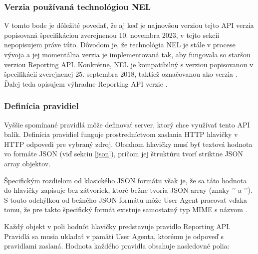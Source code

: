 \subsubsection{Verzia používaná technológiou NEL}

V tomto bode je dôležité povedať, že aj keď je najnovšou verziou tejto API verzia popisovaná špecifikáciou zverejnenou 10. novembra 2023, v tejto sekcii nepopisujem práve túto.
Dôvodom je, že technológia NEL je stále v procese vývoja a jej momentálna verzia je implementovaná tak, aby fungovala so staršou verziou Reporting API.
Konkrétne, NEL je kompatibilný s verziou popisovanou v špecifikácií zverejnenej 
25. septembra 2018, taktiež označovanou ako verzia \textbf{}.
Ďalej teda opisujem výhradne Reporting API verzie .

\subsubsection{Definícia pravidiel}

Vyššie spomínané pravidlá môže definovať server, ktorý chce využívať tento API balík. 
Definícia pravidiel funguje prostredníctvom zaslania HTTP hlavičky  v HTTP odpovedi pre vybraný zdroj.
Obsahom hlavičky  musí byť textová hodnota vo formáte JSON (viď sekciu \ref{json}), pričom jej štruktúru tvorí striktne JSON array objektov.

Špecifickým rozdielom od klasického JSON formátu však je, že sa táto hodnota do hlavičky
zapisuje bez zátvoriek, ktoré bežne tvoria JSON array (znaky '\code{[}' a '\code{]}').
S touto odchýlkou od bežného JSON formátu môže User Agent pracovať vďaka tomu, že pre takto špecifický formát existuje samostatný typ MIME s názvom . 

\pagebreak

Každý objekt v poli hodnôt hlavičky  predstavuje pravidlo Reporting API.
Pravidlá sa musia ukladať v pamäti User Agenta, ktorému je odpoveď s pravidlami zaslaná.
Hodnota každého pravidla obsahuje nasledovné polia: 

